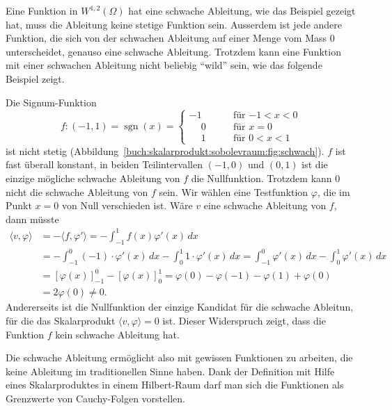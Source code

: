 Eine Funktion in $W^{1,2}(\Omega)$ hat eine schwache Ableitung,
wie das Beispiel gezeigt hat, muss die Ableitung keine stetige
Funktion sein.
Ausserdem ist jede andere Funktion, die sich von der schwachen
Ableitung auf einer Menge vom Mass 0 unterscheidet, genauso eine
schwache Ableitung.
Trotzdem kann eine Funktion mit einer schwachen Ableitung nicht
beliebig ``wild'' sein, wie das folgende Beispiel zeigt.

\begin{beispiel}
\label{buch:skalarprodukt:sobolevraum:bsp:schwachexistiertnicht}
Die Signum-Funktion
\[
f\colon (-1,1) = \operatorname{sgn}(x) =
\begin{cases}
         - 1&\qquad\text{für $-1<x<0$}\\
\phantom{-}0&\qquad\text{für $x=0$}\\
\phantom{-}1&\qquad\text{für $0<x<1$}
\end{cases}
\]
ist nicht stetig (Abbildung~\ref{buch:skalarprodukt:sobolevraum:fig:schwach}).
$f$ ist fast überall konstant, in beiden Teilintervallen $(-1,0)$ und
$(0,1)$ ist die einzige mögliche schwache Ableitung von $f$ die
Nullfunktion.
Trotzdem kann $0$ nicht die schwache Ableitung von $f$ sein.
Wir wählen eine Testfunktion $\varphi$, die im Punkt $x=0$ von
Null verschieden ist.
Wäre $v$ eine schwache Ableitung von $f$, dann müsste
\begin{align*}
\langle v,\varphi\rangle
&=
-\langle f,\varphi'\rangle
=
-\int_{-1}^1 f(x) \varphi'(x)\,dx
\\
&=
-\int_{-1}^0 (-1)\cdot \varphi'(x)\,dx
-\int_{0}^1 1\cdot \varphi'(x)\,dx
=
\int_{-1}^0 \varphi'(x)\,dx
-
\int_{0}^1 \varphi'(x)\,dx
\\
&=
[\varphi(x)]_{-1}^0
-
[\varphi(x)]_{0}^1
=
\varphi(0)-\varphi(-1)
-
\varphi(1)+\varphi(0)
\\
&=
2\varphi(0)
\ne 0.
\end{align*}
Andererseits ist die Nullfunktion der einzige Kandidat für die
schwache Ableitun, für die das Skalarprodukt $\langle v,\varphi\rangle=0$
ist.
Dieser Widerspruch zeigt, dass die Funktion $f$ kein schwache
Ableitung hat.
\end{beispiel}

Die schwache Ableitung ermöglicht also mit gewissen Funktionen zu arbeiten,
die keine Ableitung im traditionellen Sinne haben.
Dank der Definition mit Hilfe eines Skalarproduktes in einem 
Hilbert-Raum darf man sich die Funktionen als Grenzwerte von
Cauchy-Folgen vorstellen.

%
%
